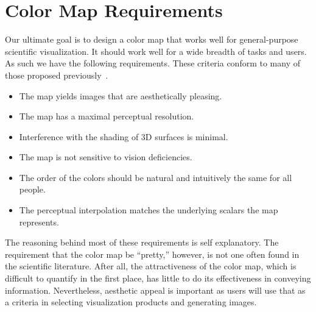 \documentclass{vgtc}                          %
\newcommand{\lcite}[1]{~\cite{#1}}
\begin{document}
\section{Color Map Requirements}
\label{sec:ColorMapRequirements}

Our ultimate goal is to design a color map that works well for
general-purpose scientific visualization.  It should work well for a wide
breadth of tasks and users.  As such we have the following requirements.
These criteria conform to many of those proposed
previously\lcite{Levkowitz92,Fortner97,Light04}.

\begin{itemize}
\item The map yields images that are aesthetically pleasing.
\item The map has a maximal perceptual resolution.
\item Interference with the shading of 3D surfaces is minimal.
\item The map is not sensitive to vision deficiencies.
\item The order of the colors should be natural and intuitively the same
  for all people.
\item The perceptual interpolation matches the underlying scalars the map
  represents.
\end{itemize}

The reasoning behind most of these requirements is self explanatory.  The
requirement that the color map be ``pretty,'' however, is not one often
found in the scientific literature.  After all, the attractiveness of the
color map, which is difficult to quantify in the first place, has little to
do its effectiveness in conveying information.  Nevertheless, aesthetic
appeal is important as users will use that as a criteria in selecting
visualization products and generating images.

\end{document}
